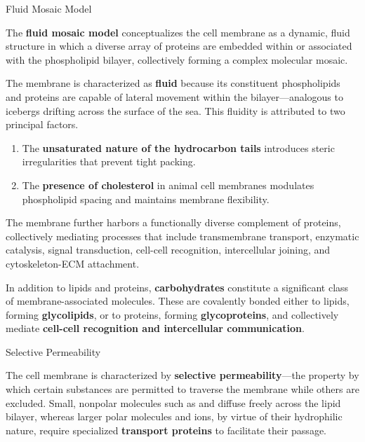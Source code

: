 \documentclass[10pt]{article}
\begin{document}
    \begin{core}[label=core:fluidmm]{Fluid Mosaic Model}

      The \textbf{fluid mosaic model} conceptualizes the cell membrane as a dynamic, fluid structure in which a diverse array of proteins are embedded within or associated with the phospholipid bilayer, collectively forming a complex molecular mosaic.


      The membrane is characterized as \textbf{fluid} because its constituent phospholipids and proteins are capable of lateral movement within the bilayer---analogous to icebergs drifting across the surface of the sea. This fluidity is attributed to two principal factors.

      \begin{enumerate}

        \item The \textbf{unsaturated nature of the hydrocarbon tails} introduces steric irregularities that prevent tight packing.

        \item The \textbf{presence of cholesterol} in animal cell membranes modulates phospholipid spacing and maintains membrane flexibility.

      \end{enumerate}


      The membrane further harbors a functionally diverse complement of proteins, collectively mediating processes that include transmembrane transport, enzymatic catalysis, signal transduction, cell-cell recognition, intercellular joining, and cytoskeleton-ECM attachment.


      In addition to lipids and proteins, \textbf{carbohydrates} constitute a significant class of membrane-associated molecules. These are covalently bonded either to lipids, forming \textbf{glycolipids}, or to proteins, forming \textbf{glycoproteins}, and collectively mediate \textbf{cell-cell recognition and intercellular communication}.

    \end{core}

    \begin{core}{Selective Permeability}

      The cell membrane is characterized by \textbf{selective permeability}---the property by which certain substances are permitted to traverse the membrane while others are excluded. Small, nonpolar molecules such as  and  diffuse freely across the lipid bilayer, whereas larger polar molecules and ions, by virtue of their hydrophilic nature, require specialized \textbf{transport proteins} to facilitate their passage.

    \end{core}
\end{document}
